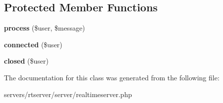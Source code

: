 \subsection*{Protected Member Functions}
\begin{DoxyCompactItemize}
\item 
\mbox{\label{class_lora_1_1_realtime_server_a805b6933fa0b69978e35fe94f3884de7}} 
{\bfseries process} (\$user, \$message)
\item 
\mbox{\label{class_lora_1_1_realtime_server_a3e89014762456a67edbe843811c78736}} 
{\bfseries connected} (\$user)
\item 
\mbox{\label{class_lora_1_1_realtime_server_aaf6375ec8ee41584a5adcf3d85d73018}} 
{\bfseries closed} (\$user)
\end{DoxyCompactItemize}


The documentation for this class was generated from the following file\+:\begin{DoxyCompactItemize}
\item 
servers/rtserver/server/realtimeserver.\+php\end{DoxyCompactItemize}
